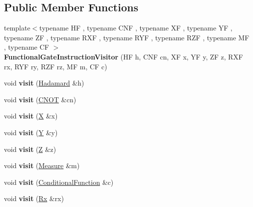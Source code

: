 \subsection*{Public Member Functions}
\begin{DoxyCompactItemize}
\item 
{\footnotesize template$<$typename HF , typename C\+NF , typename XF , typename YF , typename ZF , typename R\+XF , typename R\+YF , typename R\+ZF , typename MF , typename CF $>$ }\\{\bfseries Functional\+Gate\+Instruction\+Visitor} (HF h, C\+NF cn, XF x, YF y, ZF z, R\+XF rx, R\+YF ry, R\+ZF rz, MF m, CF c)\hypertarget{a00110_ab9e838d9bedab46a5ea54c9a0b99ef8a}{}\label{a00110_ab9e838d9bedab46a5ea54c9a0b99ef8a}

\item 
void {\bfseries visit} (\hyperlink{a00137}{Hadamard} \&h)\hypertarget{a00110_ac5245d34429dc112e7cd0e371108fcb5}{}\label{a00110_ac5245d34429dc112e7cd0e371108fcb5}

\item 
void {\bfseries visit} (\hyperlink{a00058}{C\+N\+OT} \&cn)\hypertarget{a00110_ad4eddafe8ca3906cd4aa5b98087a789a}{}\label{a00110_ad4eddafe8ca3906cd4aa5b98087a789a}

\item 
void {\bfseries visit} (\hyperlink{a00336}{X} \&x)\hypertarget{a00110_ac5d184daee7e755c9ede67b34bc2d091}{}\label{a00110_ac5d184daee7e755c9ede67b34bc2d091}

\item 
void {\bfseries visit} (\hyperlink{a00342}{Y} \&y)\hypertarget{a00110_a11dfa753a155346a45d7116a78c8f39f}{}\label{a00110_a11dfa753a155346a45d7116a78c8f39f}

\item 
void {\bfseries visit} (\hyperlink{a00343}{Z} \&z)\hypertarget{a00110_a4baf19da581fa9875739a227aba9cf60}{}\label{a00110_a4baf19da581fa9875739a227aba9cf60}

\item 
void {\bfseries visit} (\hyperlink{a00215}{Measure} \&m)\hypertarget{a00110_ad946faf8e2b6eff3e9e142907ec8e05a}{}\label{a00110_ad946faf8e2b6eff3e9e142907ec8e05a}

\item 
void {\bfseries visit} (\hyperlink{a00060}{Conditional\+Function} \&c)\hypertarget{a00110_a5cdb38902c241e7ae672a2631f1d61f3}{}\label{a00110_a5cdb38902c241e7ae672a2631f1d61f3}

\item 
void {\bfseries visit} (\hyperlink{a00256}{Rx} \&rx)\hypertarget{a00110_a6eb99e4b488773c750b7d9734ac1e885}{}\label{a00110_a6eb99e4b488773c750b7d9734ac1e885}


\end{DoxyCompactItemize}
